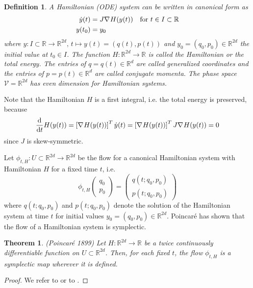 \documentclass[twoside,a4paper]{article}
\newtheorem{definition}{Definition}
\newtheorem{theorem}{Theorem}
\begin{document}
\begin{definition}
	A Hamiltonian (ODE) system can be written in canonical form as
	\begin{align*}
		\dot{y}(t) &= J \nabla_{}{H}(y(t)) \quad \text{for } t \in I \subset \mathbb{R} \\
		y(t_0) &= y_0
	\end{align*}
	where $y: I \subset \mathbb{R} \to \mathbb{R}^{2d},\, t \mapsto y(t) = (q(t),p(t))$ and 
	$y_0 = (q_0, p_0) \in \mathbb{R}^{2d}$ the initial value at $t_0 \in I$. 
	The function $H: \mathbb{R}^{2d} \to \mathbb{R}$ is called the Hamiltonian 
	or the total energy. The entries of $q = q(t) \in \mathbb{R}^d$ are called 
	generalized coordinates
	and the entries of $p=p(t) \in \mathbb{R}^d$ are called conjugate momenta. 
	The phase space $\mathcal{V} = \mathbb{R}^{2d}$ has even dimension for Hamiltonian systems.
\end{definition}

Note that the Hamiltonian $H$ is a first integral, i.e. the total energy is preserved, because
\begin{equation*}
	\frac{\mathrm{d}^{}}{\mathrm{d}t} H(y(t)) = \left[ \nabla_{}{H}(y(t)) \right]^T \dot{y}(t) = 
	\left[ \nabla_{}{H}(y(t)) \right]^T J \nabla_{}{H}(y(t)) = 0
\end{equation*}
since $J$ is skew-symmetric.

Let $\phi_{t,H} : U \subset \mathbb{R}^{2d} \to \mathbb{R}^{2d}$ be the flow for a 
canonical Hamiltonian system with Hamiltonian $H$ for a fixed time $t$, i.e.
\begin{equation*}
	\phi_{t,H}\begin{pmatrix}
		q_0 \\
		p_0
	\end{pmatrix}
	= \begin{pmatrix}
		q(t; q_0, p_0) \\
		p(t; q_0, p_0)
	\end{pmatrix}
\end{equation*}
where $q(t; q_0, p_0)$ and $p(t; q_0, p_0)$ denote the solution of the Hamiltonian system
at time $t$ for initial values $y_0 = (q_0,p_0) \in \mathbb{R}^{2d}$. 
Poincaré has shown that the flow of a Hamiltonian system is symplectic.

\begin{theorem}(Poincaré 1899)
	Let $H: \mathbb{R}^{2d} \to \mathbb{R}$ be a twice continuously differentiable
	function on $U \subset \mathbb{R}^{2d}$. Then, for each fixed $t$, the flow
	$\phi_{t,H}$ is a symplectic map wherever it is defined.
\end{theorem}
\begin{proof}
	We refer to \citet[Theorem 2.4, p.~184]{hairer2006} 
	or to \citet[Theorem 1, p.~54]{leimkuhler_reich_2005}.
\end{proof}
\end{document}

